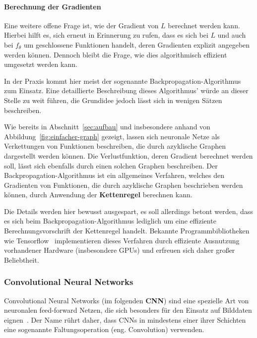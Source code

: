 \paragraph{Berechnung der Gradienten}

Eine weitere offene Frage ist, wie der Gradient von $L$ berechnet werden
kann. Hierbei hilft es, sich erneut in Erinnerung zu rufen, dass es sich
bei $L$ und auch bei $f_\theta$ um geschlossene Funktionen handelt,
deren Gradienten explizit angegeben werden k\"onnen.
Dennoch bleibt die Frage, wie dies algorithmisch effizient umgesetzt werden
kann.

In der Praxis kommt hier meist der sogenannte
Backpropagation-Algorithmus~\cite{backpropagation} zum Einsatz.
Eine detaillierte Beschreibung dieses Algorithmus' w\"urde an dieser
Stelle zu weit f\"uhren, die Grundidee jedoch l\"asst sich in wenigen
S\"atzen beschreiben.

Wie bereits in Abschnitt~\ref{sec:aufbau} und insbesondere anhand von
Abbildung~\ref{fig:einfacher-graph} gezeigt, lassen sich neuronale Netze
als Verkettungen von Funktionen beschreiben, die durch
azyklische Graphen dargestellt werden k\"onnen.
Die Verlustfunktion, deren Gradient berechnet werden soll, l\"asst sich
ebenfalls durch einen solchen Graphen beschreiben.
Der Backpropagation-Algorithmus ist ein allgemeines Verfahren, welches den
Gradienten von
Funktionen, die durch azyklische Graphen beschrieben werden k\"onnen,
durch Anwendung der \textbf{Kettenregel} berechnen kann.

Die Details werden hier bewusst ausgespart, es soll allerdings betont
werden, dass es sich beim Backpropagation-Algorithmus lediglich um eine
effiziente Berechnungsvorschrift der Kettenregel handelt.
Bekannte Programmbibliotheken wie Tensorflow~\cite{tensorflow2015-whitepaper}
implementieren dieses Verfahren durch effiziente Ausnutzung vorhandener
Hardware (insbesondere GPUs) und erfreuen sich daher
gro{\ss}er Beliebtheit.

\subsubsection{Convolutional Neural Networks}

Convolutional Neural Networks (im folgenden \textbf{CNN}) sind eine
spezielle Art von neuronalen feed-forward Netzen, die sich besonders f\"ur den
Einsatz auf Bilddaten eignen~\cite{Goodfellow-et-al-2016}.
Der Name r\"uhrt daher, dass CNNs in mindestens einer ihrer Schichten
eine sogenannte Faltungsoperation (eng. Convolution) verwenden.


